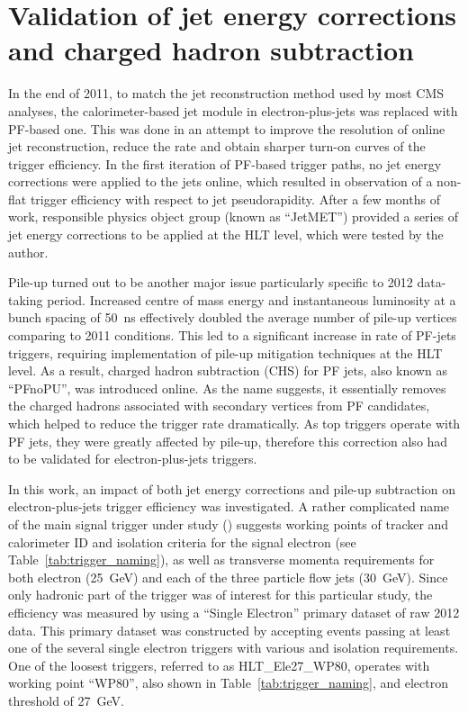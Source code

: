 \section{Validation of jet energy corrections and charged hadron subtraction}
\label{s:JEC_PFnoPU_validation}
In the end of 2011, to match the jet reconstruction method used by most CMS analyses, the calorimeter-based jet module
in electron-plus-jets was replaced with PF-based one. This was done in an attempt to improve the \pt resolution of
online jet reconstruction, reduce the rate and obtain sharper turn-on curves of the trigger efficiency. In the first
iteration of PF-based trigger paths, no jet energy corrections were applied to the jets online, which resulted in
observation of a non-flat trigger efficiency with respect to jet pseudorapidity. After a few months of work, responsible
physics object group (known as ``JetMET'') provided a series of jet energy corrections to be applied at the HLT level,
which were tested by the author.

Pile-up turned out to be another major issue particularly specific to 2012 data-taking period. Increased centre of mass
energy and instantaneous luminosity at a bunch spacing of \SI{50}{\ns} effectively doubled the average number of pile-up
vertices comparing to 2011 conditions. This led to a significant increase in rate of PF-jets triggers, requiring
implementation of pile-up mitigation techniques at the HLT level. As a result, charged hadron subtraction (CHS) for PF
jets, also known as ``PFnoPU'', was introduced online. As the name suggests, it essentially removes the charged hadrons
associated with secondary vertices from PF candidates, which helped to reduce the trigger rate dramatically. As top
triggers operate with PF jets, they were greatly affected by pile-up, therefore this correction also had to be validated
for electron-plus-jets triggers.


In this work, an impact of both jet energy corrections and pile-up subtraction on electron-plus-jets trigger efficiency
was investigated. A rather complicated name of the main signal trigger under study (\HLTThreeCentralPFJet) suggests
working points of tracker and calorimeter ID and isolation criteria for the signal electron (see
Table~\ref{tab:trigger_naming}), as well as transverse momenta requirements for both electron (\SI{25}{\GeV}) and each
of the three particle flow jets (\SI{30}{\GeV}). Since only hadronic part of the trigger was of interest for this
particular study, the efficiency was measured by using a ``Single Electron'' primary dataset of raw 2012 data. This
primary dataset was constructed by accepting events passing at least one of the several single electron triggers with
various \pt and isolation requirements. One of the loosest triggers, referred to as HLT\_Ele27\_WP80, operates with
working point ``WP80'', also shown in Table~\ref{tab:trigger_naming}, and electron \pt threshold of \SI{27}{\GeV}.

